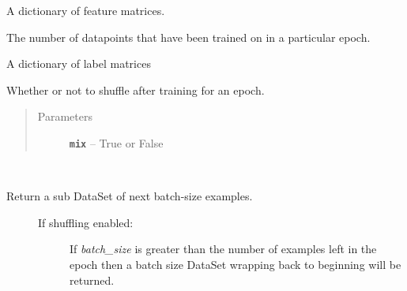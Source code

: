 \documentclass[letterpaper,10pt,english]{sphinxmanual}
\begin{document}
\begin{fulllineitems}
\begin{fulllineitems}
\label{loader:loader.DataSet.features}
A dictionary of feature matrices.

\end{fulllineitems}


\begin{fulllineitems}
\label{loader:loader.DataSet.index_in_epoch}
The number of datapoints that have been trained on in a particular epoch.

\end{fulllineitems}


\begin{fulllineitems}
\label{loader:loader.DataSet.labels}
A dictionary of label matrices

\end{fulllineitems}


\begin{fulllineitems}
\label{loader:loader.DataSet.mix_after_epoch}
Whether or not to shuffle after training for an epoch.
\begin{quote}\begin{description}
\item[{Parameters}] \leavevmode
\textbf{\texttt{mix}} -- True or False

\end{description}\end{quote}

\end{fulllineitems}


\begin{fulllineitems}
\label{loader:loader.DataSet.next_batch}~\begin{description}
\item[{Return a sub DataSet of next batch-size examples.}] \leavevmode\begin{description}
\item[{If shuffling enabled:}] \leavevmode
If \emph{batch\_size}
is greater than the number of examples left in the epoch then a batch size DataSet wrapping back to
beginning will be returned.


\end{description}
\end{description}
\end{fulllineitems}
\end{fulllineitems}
\end{document}
